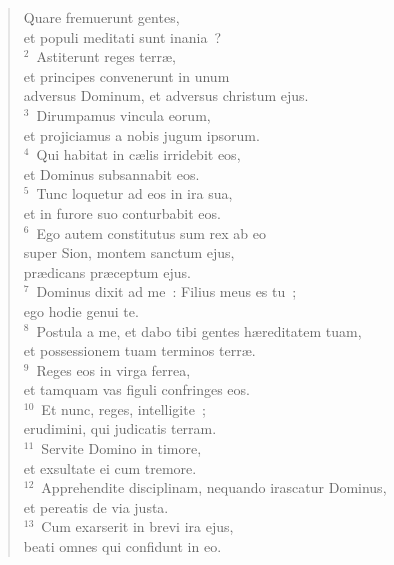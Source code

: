 \begin{flushleft}\begin{verse}\vspace{-19pt}Quare fremuerunt gentes,\\ et populi meditati sunt inania~?\\
${}^{2}$~Astiterunt reges terr\ae ,\\ et principes convenerunt in unum\\ adversus Dominum, et adversus christum ejus.\\
${}^{3}$~Dirumpamus vincula eorum,\\ et projiciamus a nobis jugum ipsorum.\\
${}^{4}$~Qui habitat in c\ae lis irridebit eos,\\ et Dominus subsannabit eos.\\
${}^{5}$~Tunc loquetur ad eos in ira sua,\\ et in furore suo conturbabit eos.\\
${}^{6}$~Ego autem constitutus sum rex ab eo\\ super Sion, montem sanctum ejus,\\ pr\ae dicans pr\ae ceptum ejus.\\
${}^{7}$~Dominus dixit ad me~: Filius meus es tu~;\\ ego hodie genui te.\\
${}^{8}$~Postula a me, et dabo tibi gentes h\ae reditatem tuam,\\ et possessionem tuam terminos terr\ae .\\
${}^{9}$~Reges eos in virga ferrea,\\ et tamquam vas figuli confringes eos.\\
${}^{10}$~Et nunc, reges, intelligite~;\\ erudimini, qui judicatis terram.\\
${}^{11}$~Servite Domino in timore,\\ et exsultate ei cum tremore.\\
${}^{12}$~Apprehendite disciplinam, nequando irascatur Dominus,\\ et pereatis de via justa.\\
${}^{13}$~Cum exarserit in brevi ira ejus,\\ beati omnes qui confidunt in eo.\end{verse}\end{flushleft}


